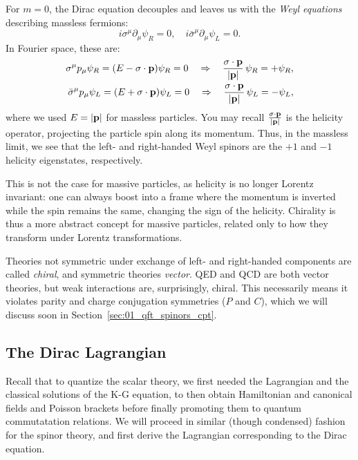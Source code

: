 For $m = 0$, the Dirac equation decouples and leaves us with the \textit{Weyl equations} describing massless fermions:
\begin{equation}
	\label{eq:01_qft_spinors_weyl}
	i\sigma^\mu\partial_\mu \psi_R= 0, \quad i\bar{\sigma}^\mu\partial_\mu \psi_L = 0.
\end{equation}
In Fourier space, these are:
\begin{equation}
	\label{eq:01_qft_spinors_weyl_fourier}
	\begin{split}
		\sigma^\mu p_\mu \psi_R = (E - \mathbf{\sigma}\cdot\mathbf{p})\psi_R = 0 \quad \Rightarrow \quad  \frac{\mathbf{\sigma}\cdot\mathbf{p}}{\left\lvert \mathbf{p} \right\rvert}\, \psi_R = +\psi_R, \\
		\bar{\sigma}^\mu p_\mu \psi_L = (E + \mathbf{\sigma}\cdot\mathbf{p})\psi_L = 0 \quad \Rightarrow \quad \frac{\mathbf{\sigma}\cdot\mathbf{p}}{\left\lvert \mathbf{p} \right\rvert}\, \psi_L = -\psi_L,
	\end{split}
\end{equation}
where we used $E = \left\lvert \mathbf{p} \right\rvert$ for massless particles.
You may recall $\frac{\mathbf{\sigma}\cdot\mathbf{p}}{\left\lvert \mathbf{p} \right\rvert}$ is the helicity operator, projecting the particle spin along its momentum.
Thus, in the massless limit, we see that the left- and right-handed Weyl spinors are the $+1$ and $-1$ helicity eigenstates, respectively.

This is not the case for massive particles, as helicity is no longer Lorentz invariant: one can always boost into a frame where the momentum is inverted while the spin remains the same, changing the sign of the helicity.
Chirality is thus a more abstract concept for massive particles, related only to how they transform under Lorentz transformations.

Theories not symmetric under exchange of left- and right-handed components are called \textit{chiral}, and symmetric theories \textit{vector}.
QED and QCD are both vector theories, but weak interactions are, surprisingly, chiral.
This necessarily means it violates parity and charge conjugation symmetries ($P$ and $C$), which we will discuss soon in Section~\ref{sec:01_qft_spinors_cpt}.


\subsection{The Dirac Lagrangian}
\label{sec:01_qft_spinors_lagrangian}

Recall that to quantize the scalar theory, we first needed the Lagrangian and the classical solutions of the K-G equation, to then obtain Hamiltonian and canonical fields and Poisson brackets before finally promoting them to quantum commutatation relations.
We will proceed in similar (though condensed) fashion for the spinor theory, and first derive the Lagrangian corresponding to the Dirac equation.

